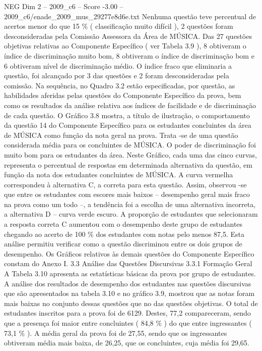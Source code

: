 \begin{textsample}{NEG Dim 2 – 2009\_c6 – Score -3.00 – 2009\_c6/enade\_2009\_mus\_29277e8d6e.txt}
Nenhuma questão teve percentual de acertos menor do que 15 \% ( classificação muito difícil ), 2 questões foram desconsideradas pela Comissão Assessora da Área de MÚSICA.
Das 27 questões objetivas relativas ao Componente Específico ( ver Tabela 3.9 ), 8 obtiveram o índice de discriminação muito bom, 8 obtiveram o índice de discriminação bom e 6 obtiveram nível de discriminação médio.
O índice fraco que eliminaria a questão, foi alcançado por 3 das questões e 2 foram desconsideradas pela comissão.
Na sequência, no Quadro 3.2 estão especificadas, por questão, as habilidades aferidas pelas questões do Componente Específico da prova, bem como os resultados da análise relativa aos índices de facilidade e de discriminação de cada questão.
O Gráfico 3.8 mostra, a título de ilustração, o comportamento da questão 14 do Componente Específico para os estudantes concluintes da área de MÚSICA como função da nota geral na prova.
Trata -se de uma questão considerada média para os concluintes de MÚSICA.
O poder de discriminação foi muito bom para os estudantes da área.
Neste Gráfico, cada uma das cinco curvas, representa o percentual de respostas em determinada alternativa da questão, em função da nota dos estudantes concluintes de MÚSICA.
A curva vermelha correspondeu à alternativa C, a correta para esta questão.
Assim, observou -se que entre os estudantes com escores mais baixos – desempenho geral mais fraco na prova como um todo –, a tendência foi a escolha de uma alternativa incorreta, a alternativa D – curva verde escuro.
A proporção de estudantes que selecionaram a resposta correta C aumentou com o desempenho deste grupo de estudantes chegando ao acerto de 100 \% dos estudantes com notas pelo menos 87,5.
Esta análise permitiu verificar como a questão discriminou entre os dois grupos de desempenho.
Os Gráficos relativos às demais questões do Componente Específico constam do Anexo I. 3.3 Análise das Questões Discursivas 3.3.1 Formação Geral A Tabela 3.10 apresenta as estatísticas básicas da prova por grupo de estudantes.
A análise dos resultados de desempenho dos estudantes nas questões discursivas que são apresentados na tabela 3.10 e no gráfico 3.9, mostrou que as notas foram mais baixas no conjunto dessas questões que no das questões objetivas.
O total de estudantes inscritos para a prova foi de 6129.
Destes, 77,2 compareceram, sendo que a presença foi maior entre concluintes ( 84,8 \% ) do que entre ingressantes ( 73,1 \% ).
A média geral da prova foi de 27,55, sendo que os ingressantes obtiveram média mais baixa, de 26,25, que os concluintes, cuja média foi 29,65.

\end{textsample}
